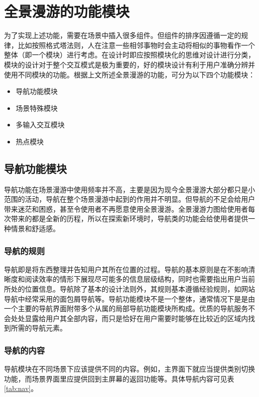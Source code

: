 \section{全景漫游的功能模块}
为了实现上述功能，需要在场景中插入很多组件。但组件的排序因遵循一定的规律，比如按照格式塔法则，人在注意一些相邻事物时会主动将相似的事物看作一个整体（即一个模块）进行考虑。在设计时即应按照模块化的思维对设计进行分类，模块的设计对于整个交互模式是极为重要的，好的模块设计有利于用户准确分辨并使用不同模块的功能。根据上文所述全景漫游的功能，可分为以下四个功能模块：
\begin{itemize}
	\item 导航功能模块
	\item 场景特殊模块
	\item 多输入交互模块
	\item 热点模块
\end{itemize}

\subsection{导航功能模块}
导航功能在场景漫游中使用频率并不高，主要是因为现今全景漫游大部分都只是小范围的活动，导航在整个场景漫游中起到的作用并不明显。但导航的不足会给用户带来迷茫和困惑，甚至令使用者不再愿意使用全景漫游。全景漫游力图给使用者每次带来的都是全新的历程，所以在探索新环境时，导航类的功能会给使用者提供一种情景和舒适感。

\subsubsection{导航的规则}
导航即是将东西整理并告知用户其所在位置的过程。导航的基本原则是在不影响清晰度和阅读效率的情形下展现尽可能多的信息层级结构，同时也需要指出用户当前所处的位置信息。导航除了基本的设计法则外，其规则基本遵循经验规则，如网站导航中经常采用的面包屑导航等。导航功能模块不是一个整体，通常情况下是是由一个主要的导航界面附带多个从属的局部导航功能模块所构成。优质的导航服务不会处处显露给用户其全部内容，而只是恰好在用户需要时能够在比较近的区域内找到所需的导航元素。

\subsubsection{导航的内容}
导航模块在不同场景下应该提供不同的内容。例如，主界面下就应当提供类别切换功能，而场景界面里应提供回到主屏幕的返回功能等。具体导航内容可见表\ref{tab:nav}。

